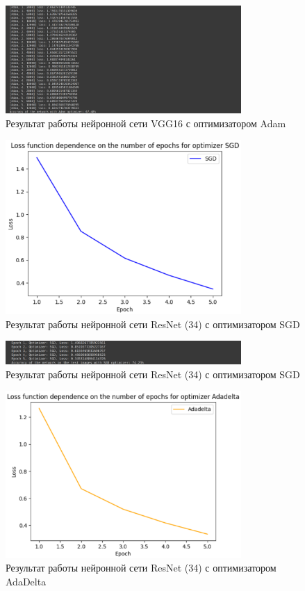 \documentclass[a4paper, 14pt]{extarticle}
\begin{document}
\begin{figure}[!htb]
	\centering
	\includegraphics[width=0.8\textwidth]{img11}
\caption{Результат работы нейронной сети VGG16 с оптимизатором Adam}
\label{fig:img11}
\end{figure}

\begin{figure}[!htb]
	\centering
	\includegraphics[width=0.8\textwidth]{img12}
\caption{Результат работы нейронной сети ResNet (34) с оптимизатором SGD}
\label{fig:img12}
\end{figure}

\begin{figure}[!htb]
	\centering
	\includegraphics[width=0.8\textwidth]{img13}
\caption{Результат работы нейронной сети ResNet (34) с оптимизатором SGD}
\label{fig:img13}
\end{figure}

\begin{figure}[!htb]
	\centering
	\includegraphics[width=0.8\textwidth]{img14}
\caption{Результат работы нейронной сети ResNet (34) с оптимизатором AdaDelta}
\label{fig:img14}
\end{figure}
\end{document}
